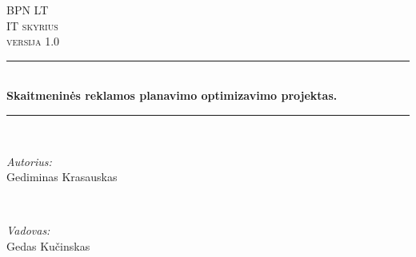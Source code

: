 \begin{titlepage}

\newcommand{\HRule}{\rule{\linewidth}{0.5mm}} %

\center %
 

\textsc{\LARGE BPN LT}\\[1.5cm] %
\textsc{\Large IT skyrius}\\[0.5cm] %
\textsc{\large versija 1.0}\\[0.5cm] %


\HRule \\[0.4cm]
{ \huge \bfseries Skaitmeninės reklamos planavimo optimizavimo projektas.}\\[0.4cm] %
\HRule \\[1.5cm]
 

\begin{minipage}{0.4\textwidth}
\begin{flushleft} \large
\emph{Autorius:}\\
Gediminas Krasauskas %
\end{flushleft}
\end{minipage}
~
\begin{minipage}{0.4\textwidth}
\begin{flushright} \large
\emph{Vadovas:} \\
Gedas Kučinskas %
\end{flushright}
\end{minipage}\\[2cm]



\end{titlepage}
